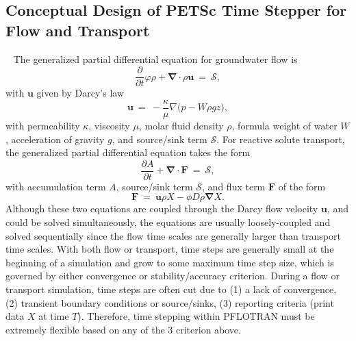 \documentclass[12pt]{article}
\newcommand{\eq}{\ =\ }
\newcommand{\p}{{\partial}}
\renewcommand{\S}{{\mathcal S}}
\newcommand{\bnabla}{\boldsymbol{\nabla}}
\newcommand{\bF}{\boldsymbol{F}}
\newcommand{\bu}{\boldsymbol{u}}
\begin{document}
\subsection*{Conceptual Design of PETSc Time Stepper for Flow and Transport}
\vspace{-16pt}
~
The generalized partial differential equation for groundwater flow is 
\begin{equation}\label{flow}
\frac{\p}{\p t} \varphi\rho + \bnabla\cdot\rho\bu\eq \S,
\end{equation}
with $\bu$ given by Darcy's law
\begin{equation}
\bu\eq-\frac{\kappa}{\mu}\nabla\big(p-W\rho g z\big),
\end{equation}
with permeability $\kappa$, viscosity $\mu$, molar fluid density $\rho$, formula weight of water $W$, acceleration of gravity $g$, and source/sink term $\S$. For reactive solute transport, the generalized partial differential equation takes the form
\begin{equation}\label{tran}
\frac{\p A}{\p t} + \bnabla\cdot\bF \eq \S,
\end{equation}
with accumulation term $A$, source/sink term $\S$, and flux term $\bF$ of the form
\begin{equation}
\bF \eq \bu\rho X - \phi D \rho\bnabla X.
\end{equation}
Although these two equations are coupled through the Darcy flow velocity $\bu$, and could be solved simultaneously, the equations are usually loosely-coupled and solved sequentially since the flow time scales are generally larger than transport time scales.  With both flow or transport, time steps are generally small at the beginning of a simulation and grow to some maximum time step size, which is governed by either convergence or stability/accuracy criterion. During a flow or transport simulation, time steps are often cut due to (1) a lack of convergence, (2) transient boundary conditions or source/sinks, (3) reporting criteria (print data $X$ at time $T$). Therefore, time stepping within PFLOTRAN must be extremely flexible based on any of the 3 criterion above.  
\end{document}
